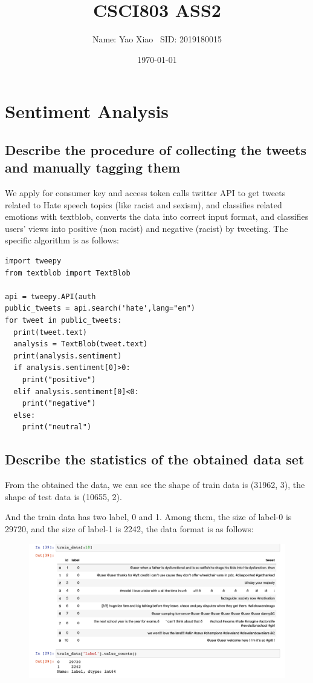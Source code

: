 \documentclass{article}
\title{CSCI803 ASS2}
\author{Name: Yao Xiao \ SID: 2019180015}
\date{\today}
\begin{document}
\maketitle

\section{Sentiment Analysis}
\subsection{Describe the procedure of collecting the tweets and manually tagging them}
We apply for consumer key and access token calls twitter API to get tweets related to Hate speech topics (like racist and sexism), and classifies related emotions with textblob, converts the data into correct input format, and classifies users' views into positive (non racist) and negative (racist) by tweeting. 
The specific algorithm is as follows:
\begin{lstlisting}
import tweepy
from textblob import TextBlob

api = tweepy.API(auth
public_tweets = api.search('hate',lang="en")
for tweet in public_tweets:
  print(tweet.text)
  analysis = TextBlob(tweet.text)
  print(analysis.sentiment)
  if analysis.sentiment[0]>0:
    print("positive")
  elif analysis.sentiment[0]<0:
    print("negative")
  else:
    print("neutral")
\end{lstlisting}


\subsection{Describe the statistics of the obtained data set}
From the obtained the data, we can see the shape of train data is (31962, 3),
the shape of test data is (10655, 2).

And the train data has two label, 0 and 1. Among them, the size of label-0 is 29720,
and the size of label-1 is 2242, the data format is as follows:

\begin{figure}[H]
    \includegraphics[width=1\textwidth]{Fig1}
\end{figure}
\end{document}
